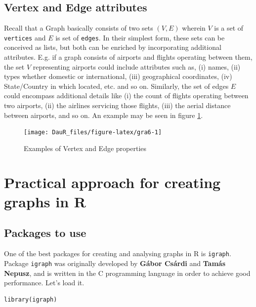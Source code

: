\documentclass[
]{book}
\begin{document}
\hypertarget{vertex-and-edge-attributes}{%
\subsection{Vertex and Edge attributes}\label{vertex-and-edge-attributes}}

Recall that a Graph basically consists of two sets \((V, E)\) wherein \(V\) is a set of \texttt{vertices} and \(E\) is set of \texttt{edges}. In their simplest form, these sets can be conceived as lists, but both can be enriched by incorporating additional attributes. E.g. if a graph consists of airports and flights operating between them, the set \(V\) representing airports could include attributes such as, (i) names, (ii) types whether domestic or international, (iii) geographical coordinates, (iv) State/Country in which located, etc. and so on. Similarly, the set of edges \(E\) could encompass additional details like (i) the count of flights operating between two airports, (ii) the airlines servicing those flights, (iii) the aerial distance between airports, and so on. An example may be seen in figure \ref{fig:gra6}.

\begin{figure}

{\centering \texttt{[image: DauR\_files/figure-latex/gra6-1]} 

}

\caption{Examples of Vertex and Edge properties}\label{fig:gra6}
\end{figure}

\hypertarget{practical-approach-for-creating-graphs-in-r}{%
\section{Practical approach for creating graphs in R}\label{practical-approach-for-creating-graphs-in-r}}

\hypertarget{packages-to-use}{%
\subsection{Packages to use}\label{packages-to-use}}

One of the best packages for creating and analysing graphs in R is \texttt{igraph}. Package \texttt{igraph} was originally developed by \textbf{Gábor Csárdi} and \textbf{Tamás Nepusz}, and is written in the C programming language in order to achieve good performance.
Let's load it.

\begin{verbatim}
library(igraph)
\end{verbatim}
\end{document}
